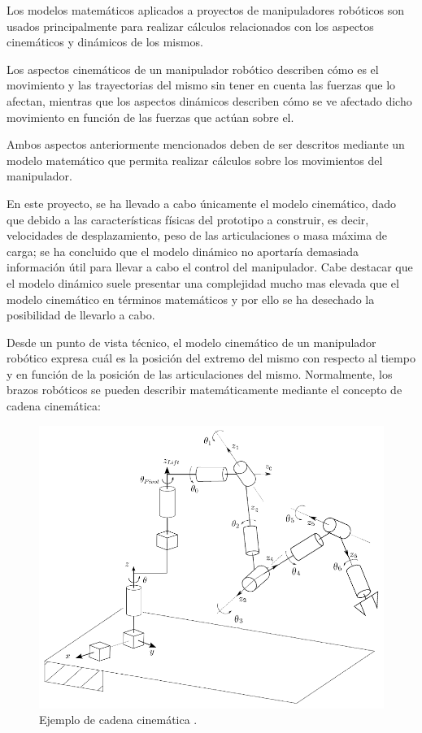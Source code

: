 Los modelos matemáticos aplicados a proyectos de manipuladores robóticos son usados principalmente para realizar cálculos relacionados con los aspectos cinemáticos y dinámicos de los mismos.

Los aspectos cinemáticos de un manipulador robótico describen cómo es el movimiento y las trayectorias del mismo sin tener en cuenta las fuerzas que lo afectan, mientras que los aspectos dinámicos describen cómo se ve afectado dicho movimiento en función de las fuerzas que actúan sobre el.

Ambos aspectos anteriormente mencionados deben de ser descritos mediante un modelo matemático que permita realizar cálculos sobre los movimientos del manipulador. 

En este proyecto, se ha llevado a cabo únicamente el modelo cinemático, dado que debido a las características físicas del prototipo a construir, es decir, velocidades de desplazamiento, peso de las articulaciones o masa máxima de carga; se ha concluido que el modelo dinámico no aportaría demasiada información útil para llevar a cabo el control del manipulador. Cabe destacar que el modelo dinámico suele presentar una complejidad mucho mas elevada que el modelo cinemático en términos matemáticos y por ello se ha desechado la posibilidad de llevarlo a cabo.

Desde un punto de vista técnico, el modelo cinemático de un manipulador robótico expresa cuál es la posición del extremo del mismo con respecto al tiempo y en función de la posición de las articulaciones del mismo. Normalmente, los brazos robóticos se pueden describir matemáticamente mediante el concepto de cadena cinemática:

\begin{figure}[ht!]
    \centering 
    \includegraphics[width=.6\linewidth]{pictures/kinematic chain.png}
    \caption{Ejemplo de cadena cinemática \cite{noauthor_figure_nodate}.}
    \label{fig:chains}
\end{figure}

